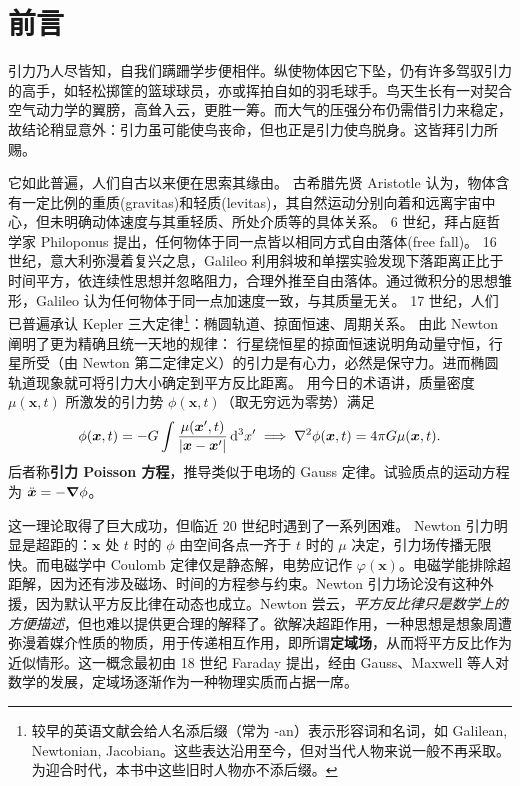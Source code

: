 \chapter*{前言}

引力乃人尽皆知，自我们蹒跚学步便相伴。纵使物体因它下坠，仍有许多驾驭引力的高手，如轻松掷筐的篮球球员，亦或挥拍自如的羽毛球手。鸟天生长有一对契合空气动力学的翼膀，高耸入云，更胜一筹。而大气的压强分布仍需借引力来稳定，故结论稍显意外：引力虽可能使鸟丧命，但也正是引力使鸟脱身。这皆拜引力所赐。

它如此普遍，人们自古以来便在思索其缘由。
古希腊先贤 Aristotle 认为，物体含有一定比例的重质(gravitas)和轻质(levitas)，其自然运动分别向着和远离宇宙中心，但未明确动体速度与其重轻质、所处介质等的具体关系。
6 世纪，拜占庭哲学家 Philoponus 提出，任何物体于同一点皆以相同方式自由落体(free fall)。
16 世纪，意大利弥漫着复兴之息，Galileo 利用斜坡和单摆实验发现下落距离正比于时间平方，依连续性思想并忽略阻力，合理外推至自由落体。通过微积分的思想雏形，Galileo 认为任何物体于同一点加速度一致，与其质量无关。
17 世纪，人们已普遍承认 Kepler 三大定律\footnote{较早的英语文献会给人名添后缀（常为 -an）表示形容词和名词，如 Galilean, Newtonian, Jacobian。这些表达沿用至今，但对当代人物来说一般不再采取。为迎合时代，本书中这些旧时人物亦不添后缀。}：椭圆轨道、掠面恒速、周期关系。
由此 Newton 阐明了更为精确且统一天地的规律：
行星绕恒星的掠面恒速说明角动量守恒，行星所受（由 Newton 第二定律定义）的引力是有心力，必然是保守力。进而椭圆轨道现象就可将引力大小确定到平方反比距离。
用今日的术语讲，质量密度 $\mu(\bm x,t)$ 所激发的引力势 $\phi(\bm x,t)$（取无穷远为零势）满足
\[\phi(\vb* x,t)=-G\int\frac{\mu(\vb* x',t)}{|\vb* x-\vb* x'|}\,\dd[3]x'\implies \nabla^2\phi(\vb* x,t)=4\pi G \mu(\vb* x,t).\]
后者称\textbf{引力 Poisson 方程}，推导类似于电场的 Gauss 定律。试验质点的运动方程为 $\ddot{\vb* x}=-\grad\phi$。

这一理论取得了巨大成功，但临近 20 世纪时遇到了一系列困难。
Newton 引力明显是超距的：$\bm x$ 处 $t$ 时的 $\phi$ 由空间各点一齐于 $t$ 时的 $\mu$ 决定，引力场传播无限快。而电磁学中 Coulomb 定律仅是静态解，电势应记作 $\varphi(\bm x)$。电磁学能排除超距解，因为还有涉及磁场、时间的方程参与约束。Newton 引力场论没有这种外援，因为默认平方反比律在动态也成立。Newton 尝云，\textit{平方反比律只是数学上的方便描述}，但也难以提供更合理的解释了。欲解决超距作用，一种思想是想象周遭弥漫着媒介性质的物质，用于传递相互作用，即所谓\textbf{定域场}，从而将平方反比作为近似情形。这一概念最初由 18 世纪 Faraday 提出，经由 Gauss、Maxwell 等人对数学的发展，定域场逐渐作为一种物理实质而占据一席。

